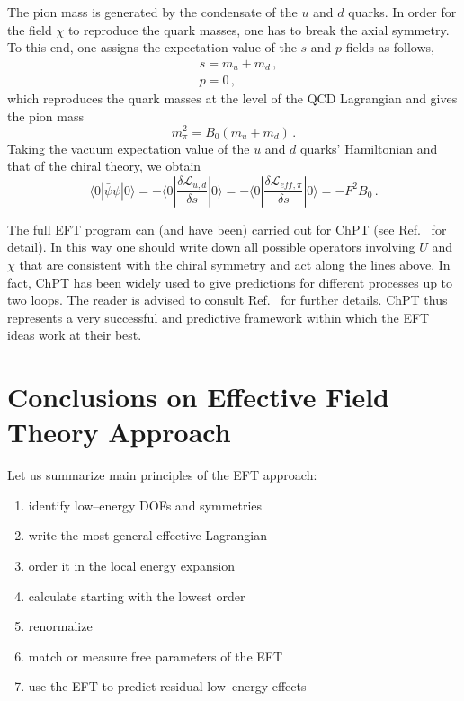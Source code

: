 \documentclass[12pt]{article}
\newcommand{\be}{\begin{equation}}
\newcommand{\ee}{\end{equation}}
\begin{document}
The pion mass is generated by the condensate of the $u$ and $d$ quarks.
In order for the field $\chi$
to reproduce the quark masses, one has to break the axial symmetry. To this end, one
assigns the expectation value of the $s$ and $p$ fields as follows,
\be
\begin{split}
&s=m_u+m_d\,,\\
&p=0\,,
 \end{split}
\ee
which reproduces the quark masses at the level of the QCD Lagrangian and
gives the pion mass
\be
m^2_\pi=
B_0(m_u+m_d)\,.
\ee
%
Taking the vacuum expectation value of the $u$ and $d$ quarks' Hamiltonian and that of the chiral theory, we obtain
\be
\langle 0| \bar \psi \psi |0\rangle =-\langle 0| \frac{\delta \mathcal{L}_{u,d}}{\delta s}|0\rangle =
-\langle 0| \frac{\delta \mathcal{L}_{eff,\pi}}{\delta s}|0\rangle
=-F^2 B_0\,.
\ee

The full EFT program can (and have been) carried out for ChPT (see  Ref.~\cite{Gasser:1984gg} for detail).
In this way one should write down all possible operators involving $U$ and $\chi$ that are consistent with the chiral symmetry and act along the lines above.
In fact, ChPT has been widely used to give predictions for different processes up to two loops.
The reader is advised to consult Ref.~\cite{Donoghue:1992dd} for further details.
ChPT thus represents a very successful and predictive framework within which the EFT ideas work at their best.

\section*{Conclusions on Effective Field Theory Approach}

Let us summarize main principles of the EFT approach:
\begin{enumerate}
\item identify low--energy DOFs and symmetries
\item write the most general effective Lagrangian
\item order it in the local energy expansion
\item calculate starting with the lowest order
\item renormalize
\item match or measure free parameters of the EFT
\item use the EFT to predict residual low--energy effects
\end{enumerate}
\end{document}
